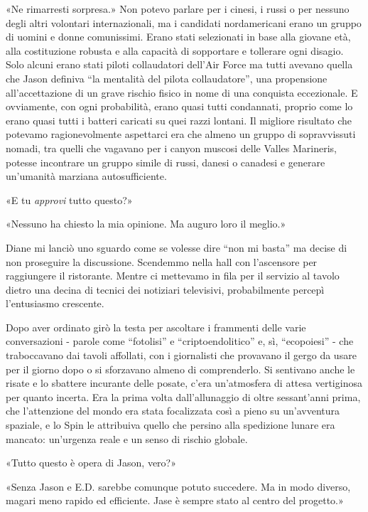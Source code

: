 «Ne rimarresti sorpresa.» Non potevo parlare per i cinesi, i russi o per
nessuno degli altri volontari internazionali, ma i candidati
nordamericani erano un gruppo di uomini e donne comunissimi. Erano stati
selezionati in base alla giovane età, alla costituzione robusta e alla
capacità di sopportare e tollerare ogni disagio. Solo alcuni erano stati
piloti collaudatori dell'Air Force ma tutti avevano quella che Jason
definiva ``la mentalità del pilota collaudatore'', una propensione
all'accettazione di un grave rischio fisico in nome di una conquista
eccezionale. E ovviamente, con ogni probabilità, erano quasi tutti
condannati, proprio come lo erano quasi tutti i batteri caricati su quei
razzi lontani. Il migliore risultato che potevamo ragionevolmente
aspettarci era che almeno un gruppo di sopravvissuti nomadi, tra quelli
che vagavano per i canyon muscosi delle Valles Marineris, potesse
incontrare un gruppo simile di russi, danesi o canadesi e generare
un'umanità marziana autosufficiente.

«E tu \emph{approvi} tutto questo?»

«Nessuno ha chiesto la mia opinione. Ma auguro loro il meglio.»

Diane mi lanciò uno sguardo come se volesse dire ``non mi basta'' ma
decise di non proseguire la discussione. Scendemmo nella hall con
l'ascensore per raggiungere il ristorante. Mentre ci mettevamo in fila
per il servizio al tavolo dietro una decina di tecnici dei notiziari
televisivi, probabilmente percepì l'entusiasmo crescente.

Dopo aver ordinato girò la testa per ascoltare i frammenti delle varie
conversazioni - parole come ``fotolisi'' e ``criptoendolitico'' e, sì,
``ecopoiesi'' - che traboccavano dai tavoli affollati, con i giornalisti
che provavano il gergo da usare per il giorno dopo o si sforzavano
almeno di comprenderlo. Si sentivano anche le risate e lo sbattere
incurante delle posate, c'era un'atmosfera di attesa vertiginosa per
quanto incerta. Era la prima volta dall'allunaggio di oltre sessant'anni
prima, che l'attenzione del mondo era stata focalizzata così a pieno su
un'avventura spaziale, e lo Spin le attribuiva quello che persino alla
spedizione lunare era mancato: un'urgenza reale e un senso di rischio
globale.

«Tutto questo è opera di Jason, vero?»

«Senza Jason e E.D. sarebbe comunque potuto succedere. Ma in modo
diverso, magari meno rapido ed efficiente. Jase è sempre stato al centro
del progetto.»

